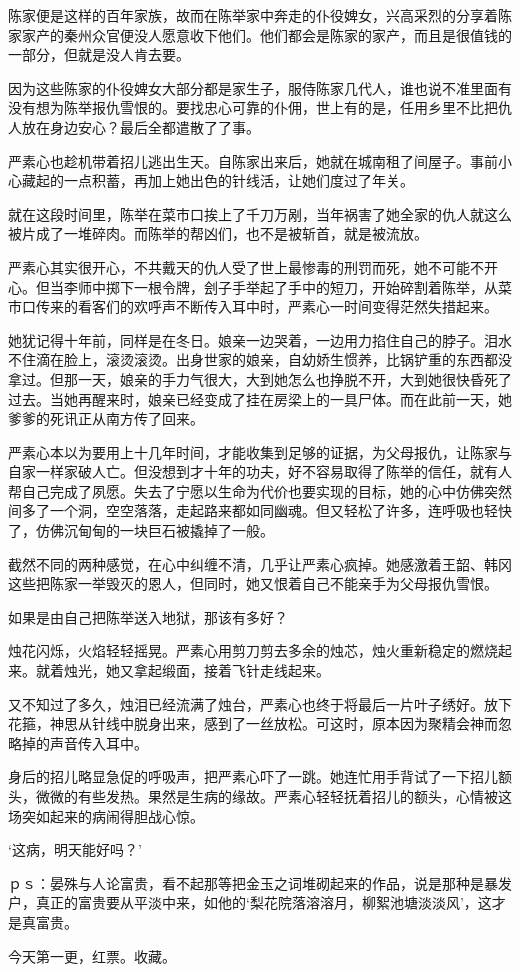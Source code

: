 陈家便是这样的百年家族，故而在陈举家中奔走的仆役婢女，兴高采烈的分享着陈家家产的秦州众官便没人愿意收下他们。他们都会是陈家的家产，而且是很值钱的一部分，但就是没人肯去要。

因为这些陈家的仆役婢女大部分都是家生子，服侍陈家几代人，谁也说不准里面有没有想为陈举报仇雪恨的。要找忠心可靠的仆佣，世上有的是，任用乡里不比把仇人放在身边安心？最后全都遣散了了事。

严素心也趁机带着招儿逃出生天。自陈家出来后，她就在城南租了间屋子。事前小心藏起的一点积蓄，再加上她出色的针线活，让她们度过了年关。

就在这段时间里，陈举在菜市口挨上了千刀万剐，当年祸害了她全家的仇人就这么被片成了一堆碎肉。而陈举的帮凶们，也不是被斩首，就是被流放。

严素心其实很开心，不共戴天的仇人受了世上最惨毒的刑罚而死，她不可能不开心。但当李师中掷下一根令牌，刽子手举起了手中的短刀，开始碎割着陈举，从菜市口传来的看客们的欢呼声不断传入耳中时，严素心一时间变得茫然失措起来。

她犹记得十年前，同样是在冬日。娘亲一边哭着，一边用力掐住自己的脖子。泪水不住滴在脸上，滚烫滚烫。出身世家的娘亲，自幼娇生惯养，比锅铲重的东西都没拿过。但那一天，娘亲的手力气很大，大到她怎么也挣脱不开，大到她很快昏死了过去。当她再醒来时，娘亲已经变成了挂在房梁上的一具尸体。而在此前一天，她爹爹的死讯正从南方传了回来。

严素心本以为要用上十几年时间，才能收集到足够的证据，为父母报仇，让陈家与自家一样家破人亡。但没想到才十年的功夫，好不容易取得了陈举的信任，就有人帮自己完成了夙愿。失去了宁愿以生命为代价也要实现的目标，她的心中仿佛突然间多了一个洞，空空落落，走起路来都如同幽魂。但又轻松了许多，连呼吸也轻快了，仿佛沉甸甸的一块巨石被撬掉了一般。

截然不同的两种感觉，在心中纠缠不清，几乎让严素心疯掉。她感激着王韶、韩冈这些把陈家一举毁灭的恩人，但同时，她又恨着自己不能亲手为父母报仇雪恨。

如果是由自己把陈举送入地狱，那该有多好？

烛花闪烁，火焰轻轻摇晃。严素心用剪刀剪去多余的烛芯，烛火重新稳定的燃烧起来。就着烛光，她又拿起缎面，接着飞针走线起来。

又不知过了多久，烛泪已经流满了烛台，严素心也终于将最后一片叶子绣好。放下花箍，神思从针线中脱身出来，感到了一丝放松。可这时，原本因为聚精会神而忽略掉的声音传入耳中。

身后的招儿略显急促的呼吸声，把严素心吓了一跳。她连忙用手背试了一下招儿额头，微微的有些发热。果然是生病的缘故。严素心轻轻抚着招儿的额头，心情被这场突如起来的病闹得胆战心惊。

‘这病，明天能好吗？’

ｐｓ：晏殊与人论富贵，看不起那等把金玉之词堆砌起来的作品，说是那种是暴发户，真正的富贵要从平淡中来，如他的‘梨花院落溶溶月，柳絮池塘淡淡风’，这才是真富贵。

今天第一更，红票。收藏。

